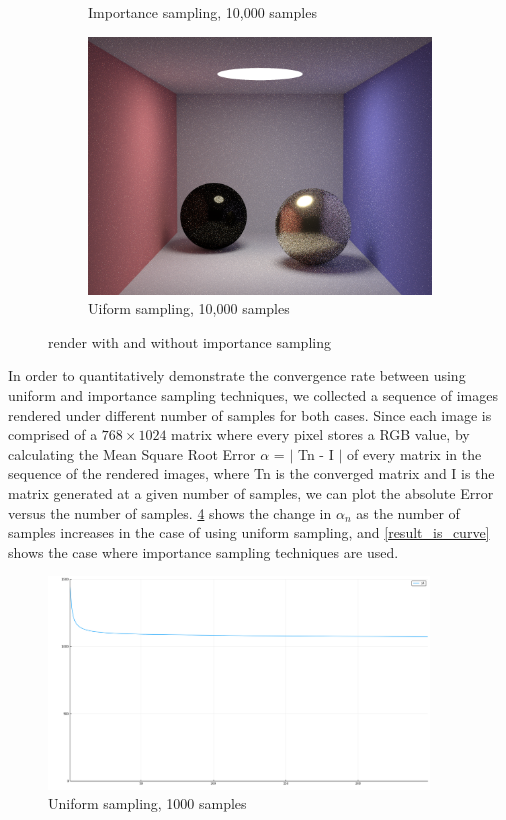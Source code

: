 \documentclass[12pt]{article}
\begin{document}
\begin{figure}
\begin{subfigure}{.5\textwidth}
    \caption{Importance sampling, 10,000 samples}
    \label{result_is10000}
  \end{subfigure}%
  \begin{subfigure}{.5\textwidth}
    \centering
    \includegraphics[width=.9\linewidth]{10KDS.png}
    \caption{Uiform sampling, 10,000 samples}
    \label{result_us10000}
  \end{subfigure}%
  \caption{render with and without importance sampling}
  \label{results}
\end{figure}

\noindent In order to quantitatively demonstrate the convergence rate between using uniform and importance sampling techniques, we collected a sequence of images rendered under different number of samples for both cases. Since each image is comprised of a $768\times 1024$ matrix where every pixel stores a RGB value, by calculating the Mean Square Root Error $\alpha$ = $|$ Tn - I $|$ of every matrix in the sequence of the rendered images, where Tn is the converged matrix and I is the matrix generated at a given number of samples, we can plot the absolute Error versus the number of samples. \cref{result_us_curve} shows the change in $\alpha_n$ as the number of samples increases in the case of using uniform sampling, and \cref{result_is_curve} shows the case where importance sampling techniques are used.

\begin{figure}[H]
  \centering
  \includegraphics[width=0.9\textwidth]{DS1000.png}
  \caption{Uniform sampling, 1000 samples}
  \label{result_us_curve}
\end{figure}
\end{document}
